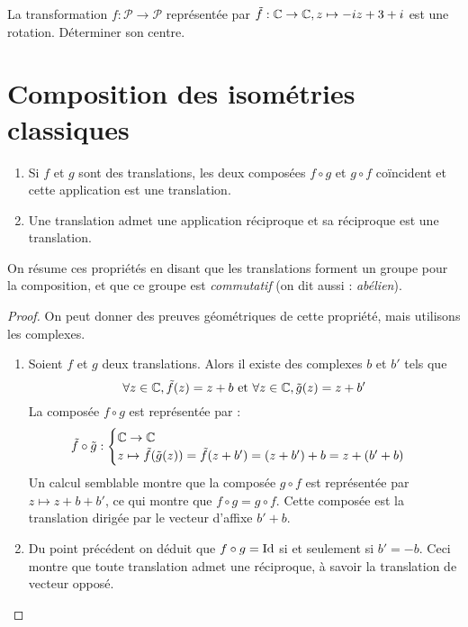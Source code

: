 \begin{exercice}
La transformation $f:\mathcal P\to \mathcal P$ représentée par $\tilde f :\mathbb{C}\to\mathbb{C},  z\mapsto -iz+3+i$ est une rotation. Déterminer son centre.
\end{exercice}

\section{Composition des isométries classiques}

\begin{proposition}
\begin{enumerate}
\item Si $f$ et $g$ sont des translations, les deux composées $f\circ g$ et $g\circ f$ coïncident et cette application est une translation.
\item Une translation admet une application réciproque et sa réciproque est une translation.
\end{enumerate}
On résume ces propriétés en disant que les translations forment un groupe pour la composition, et que ce groupe est \emph{commutatif} (on dit aussi : \emph{abélien}).
\end{proposition}
\begin{proof}
On peut donner des preuves géométriques de cette propriété, mais utilisons les complexes. 
\begin{enumerate}
\item Soient $f$ et $g$ deux translations. Alors il existe des complexes $b$ et $b'$ tels que
\[ \forall z\in\mathbb{C}, \tilde f (z) = z+b \text{ et } \forall z\in\mathbb{C}, \tilde g(z)=z+b'\]
La composée $f \circ g$ est représentée par :
\[ \tilde f \circ \tilde g  : \begin{cases}
\mathbb{C}\to\mathbb{C}\\
z\mapsto \tilde f(\tilde g(z)) = \tilde f(z+b') = (z+b')+b = z+(b'+b)
\end{cases}\]
Un calcul semblable montre que la composée $g\circ f$ est représentée par  $z\mapsto z+b+b'$, ce qui montre que $f\circ g=g\circ f$. Cette composée est la translation dirigée par le vecteur d'affixe $b'+b$. 
\item Du point précédent on déduit que $f\circ g=\operatorname{Id}$ si et seulement si $b'=-b$. Ceci montre que toute translation admet une réciproque, à savoir la translation de vecteur opposé.
\end{enumerate}
\end{proof}

